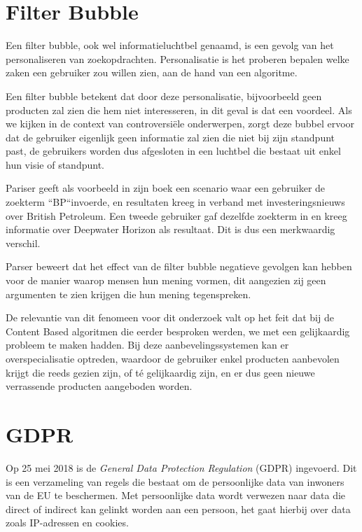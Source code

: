  \newpage
\section{Filter Bubble}
\label{sec:Filter Bubble}

Een filter bubble, ook wel informatieluchtbel genaamd, is een gevolg van het personaliseren van zoekopdrachten. Personalisatie is het proberen bepalen welke zaken een gebruiker zou willen zien, aan de hand van een algoritme. 

Een filter bubble betekent dat door deze personalisatie, bijvoorbeeld geen producten zal zien die hem niet interesseren, in dit geval is dat een voordeel. Als we kijken in de context van controversiële onderwerpen, zorgt deze bubbel ervoor dat de gebruiker eigenlijk geen informatie zal zien die niet bij zijn standpunt past, de gebruikers worden dus afgesloten in een luchtbel die bestaat uit enkel hun visie of standpunt.  \autocite{Pariser2011}

Pariser geeft als voorbeeld in zijn boek een scenario waar een gebruiker de zoekterm ``BP``invoerde, en resultaten kreeg in verband met investeringsnieuws over British Petroleum. Een tweede gebruiker gaf dezelfde zoekterm in en kreeg informatie over Deepwater Horizon als resultaat. Dit is dus een merkwaardig verschil.

Parser beweert dat het effect van de filter bubble negatieve gevolgen kan hebben voor de manier waarop mensen hun mening vormen, dit aangezien zij geen argumenten te zien krijgen die hun mening tegenspreken.


De relevantie van dit fenomeen voor dit onderzoek valt op het feit dat bij de Content Based algoritmen die eerder besproken werden, we met een gelijkaardig probleem te maken hadden. Bij deze aanbevelingssystemen kan er overspecialisatie optreden, waardoor de gebruiker enkel producten aanbevolen krijgt die reeds gezien zijn, of té gelijkaardig zijn, en er dus geen nieuwe verrassende producten aangeboden worden.

\section{GDPR}
\label{sec:GDPR}

Op 25 mei 2018 is de \textit{General Data Protection Regulation} (GDPR) ingevoerd. Dit is een verzameling van regels die bestaat om de persoonlijke data van inwoners van de EU te beschermen. Met persoonlijke data wordt verwezen naar data die direct of indirect kan gelinkt worden aan een persoon, het gaat hierbij over data zoals IP-adressen en cookies. 

